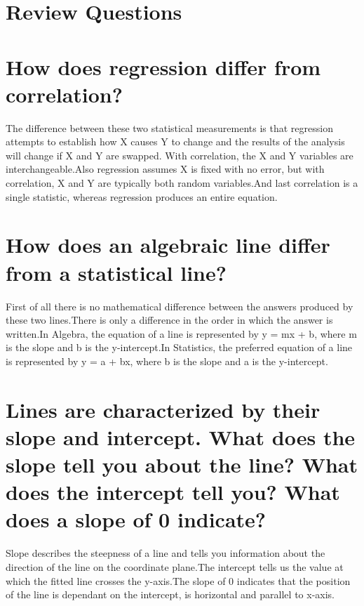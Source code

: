 \documentclass{article}
\begin{document}
\maketitle

\section*{Review Questions}


\section{How does regression differ from correlation?}

The difference between these two statistical measurements is that regression attempts to establish how X causes Y to change and the results of the analysis will change if X and Y are swapped. With correlation, the X and Y variables are interchangeable.Also regression assumes X is fixed with no error, but with correlation, X and Y are typically both random variables.And last correlation is a single statistic, whereas regression produces an entire equation.

\section{How does an algebraic line differ from a statistical line?}

First of all there is no mathematical difference between the answers produced by these two lines.There is only a difference in the order in which the answer is written.In Algebra, the equation of a line is represented by 
y = mx + b, where m is the slope and b is the y-intercept.In Statistics, the preferred equation of a line is represented by y = a + bx, where b is the slope and a is the y-intercept.

\section{ Lines are characterized by their slope and intercept. What does the slope tell you about the line? What does the intercept tell you? What does a slope of 0 indicate?}

Slope describes the steepness of a line and tells you information about the direction of the line on the coordinate plane.The intercept tells us the value at which the fitted line crosses the y-axis.The slope of 0 indicates that the position of the line is dependant on the intercept, is horizontal and parallel to x-axis.
\end{document}
